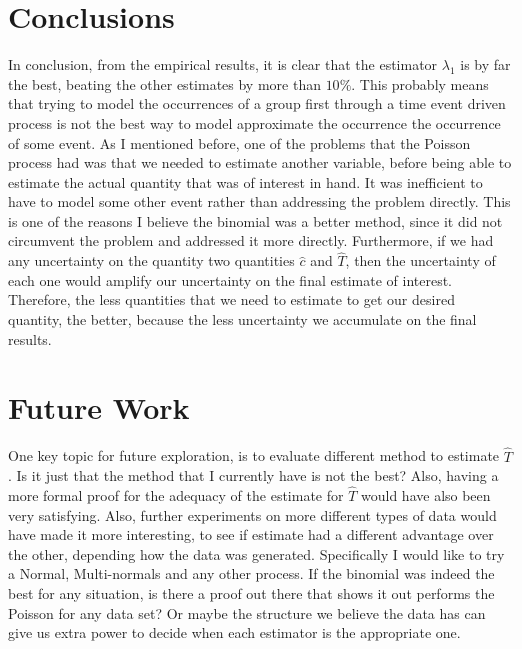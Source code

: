 \documentclass[a4paper]{article}
\begin{document}
\section{Conclusions}

In conclusion, from the empirical results, it is clear that the estimator $\lambda_1$ is by far the best, beating the other estimates by more than $10\%$.
This probably means that trying to model the occurrences of a group first through a time event driven process is not the best way to model approximate the occurrence the occurrence of some event.
As I mentioned before, one of the problems that the Poisson process had was that we needed to estimate another variable, before being able to estimate the actual quantity that was of interest in hand.
It was inefficient to have to model some other event rather than addressing the problem directly.
This is one of the reasons I believe the binomial was a better method, since it did not circumvent the problem and addressed it more directly.
Furthermore, if we had any uncertainty on the quantity two quantities $\hat{c}$ and $\hat{T}$, then the uncertainty of each one would amplify our uncertainty on the final estimate of interest.
Therefore, the less quantities that we need to estimate to get our desired quantity, the better, because the less uncertainty we accumulate on the final results. 

\section{Future Work}

One key topic for future exploration, is to evaluate different method to estimate $\hat{T}$.
Is it just that the method that I currently have is not the best?
Also, having a more formal proof for the adequacy of the estimate for $\hat{T}$ would have also been very satisfying.
Also, further experiments on more different types of data would have made it more interesting, to see if estimate had a different advantage over the other, depending how the data was generated.
Specifically I would like to try a Normal, Multi-normals and any other process.
If the binomial was indeed the best for any situation, is there a proof out there that shows it out performs the Poisson for any data set?
Or maybe the structure we believe the data has can give us extra power to decide when each estimator is the appropriate one.
\end{document}
